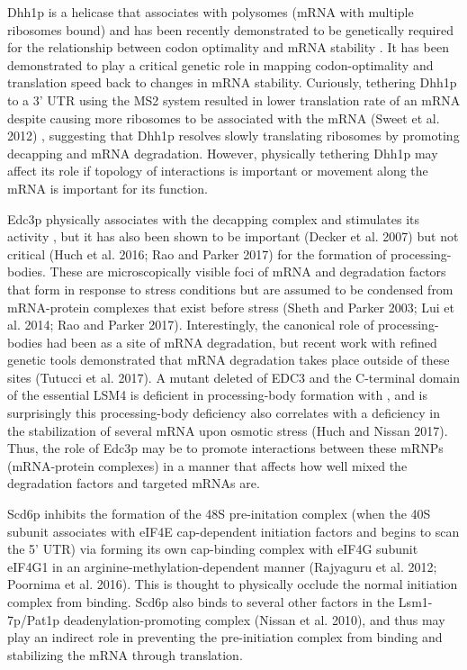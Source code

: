 Dhh1p is a helicase that associates with polysomes (mRNA
with multiple ribosomes bound) and has been recently demonstrated to
be genetically required for the relationship between codon optimality
and mRNA stability 
\parencite{radhakrishnan2016dead,presnyak2015codon,sweet2012dead}. 
It has been demonstrated to play a critical
genetic role in mapping codon-optimality and translation speed back to
changes in mRNA stability. Curiously, tethering Dhh1p to a 3’ UTR
using the MS2 system resulted in lower translation rate of an mRNA
despite causing more ribosomes to be associated with the mRNA
(Sweet et al. 2012)
, suggesting that Dhh1p resolves slowly translating
ribosomes by promoting decapping and mRNA degradation.  
However, physically tethering Dhh1p may affect its role if
topology of interactions is important or movement along the mRNA
is important for its function.

Edc3p
physically associates with the decapping complex and stimulates its
activity \parencite{nissan2010decapping}, 
but it has also been shown to be
important (Decker et al. 2007) but not critical (Huch et al. 2016; Rao
and Parker 2017) for the formation of processing-bodies. These are
microscopically visible foci of mRNA and degradation factors that form
in response to stress conditions but are assumed to be condensed from
mRNA-protein complexes that exist before stress (Sheth and Parker
2003; Lui et al. 2014; Rao and Parker 2017). Interestingly, the
canonical role of processing-bodies had been as a site of mRNA
degradation, but recent work with refined genetic tools demonstrated
that mRNA degradation takes place outside of these sites (Tutucci et
al. 2017). A mutant deleted of EDC3 and the C-terminal domain of the
essential LSM4 is deficient in processing-body formation with , and is
surprisingly this processing-body deficiency also correlates with a
deficiency in the stabilization of several mRNA upon osmotic stress
(Huch and Nissan 2017). Thus, the role of Edc3p may be to promote
interactions between these mRNPs (mRNA-protein complexes) in a manner
that affects how well mixed the degradation factors and targeted mRNAs
are.  

Scd6p inhibits the formation of the 48S pre-initation complex
(when the 40S subunit associates with eIF4E cap-dependent initiation
factors and begins to scan the 5’ UTR) via forming its own cap-binding
complex with eIF4G subunit eIF4G1 in an arginine-methylation-dependent
manner (Rajyaguru et al. 2012; Poornima et al. 2016). This is thought
to physically occlude the normal initiation complex from binding.
Scd6p also binds to several other factors in the Lsm1-7p/Pat1p
deadenylation-promoting complex (Nissan et al. 2010), and thus may
play an indirect role in preventing the pre-initiation complex from
binding and stabilizing the mRNA through translation.  

